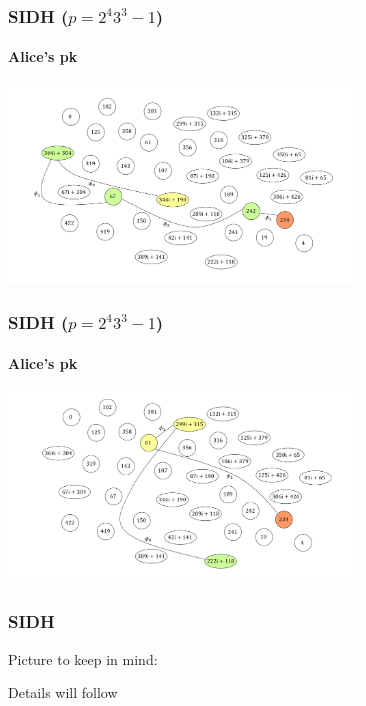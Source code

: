 \documentclass{beamer}
\begin{document}
\begin{frame}
    \frametitle{SIDH ($p = 2^4 3^3 - 1$)}
    \framesubtitle{Alice's pk}
    \begin{center}
        \includegraphics[width=25em]{alice_shared.PNG}
    \end{center}
\end{frame}

\begin{frame}
    \frametitle{SIDH ($p = 2^4 3^3 - 1$)}
    \framesubtitle{Alice's pk}
    \begin{center}
        \includegraphics[width=25em]{bob_shared.PNG}
    \end{center}
\end{frame}

\begin{frame}
    \frametitle{SIDH}
    Picture to keep in mind:
\begin{center}
\end{center}
Details will follow
\end{frame}
\end{document}
